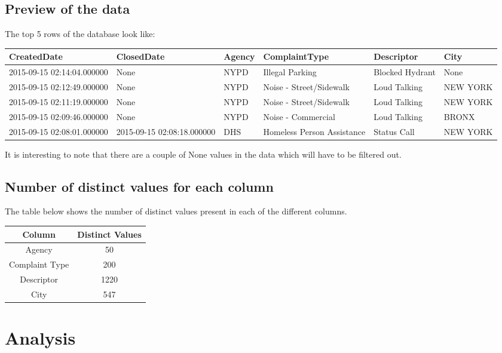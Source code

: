 \documentclass[12pt,a4paper]{article}
\begin{document}
\subsection{Preview of the data}
The top 5 rows of the database look like:

\begin{center}
 \begin{tabular}{||p{3cm} p{3cm} p{1cm} p{3cm} p{3cm} p{1.5cm}||}
 \hline
 CreatedDate & ClosedDate & Agency & ComplaintType & Descriptor & City \\ [0.5ex]
 \hline\hline
 2015-09-15 02:14:04.000000 & None & NYPD & Illegal Parking & Blocked Hydrant & None \\
 \hline
 2015-09-15 02:12:49.000000 & None & NYPD & Noise - Street/Sidewalk & Loud Talking & NEW YORK \\
 \hline
 2015-09-15 02:11:19.000000 & None & NYPD & Noise - Street/Sidewalk & Loud Talking & NEW YORK \\
 \hline
 2015-09-15 02:09:46.000000 & None & NYPD & Noise - Commercial & Loud Talking & BRONX \\
 \hline
 2015-09-15 02:08:01.000000 & 2015-09-15 02:08:18.000000 & DHS & Homeless Person Assistance & Status Call  & NEW YORK \\ [1ex]
 \hline
\end{tabular}
\end{center}

It is interesting to note that there are a couple of None values in the data which will have to be filtered out.

\subsection{Number of distinct values for each column}
The table below shows the number of distinct values present in each of the different columns.
\begin{center}
 \begin{tabular}{||c c||}
 \hline
 Column & Distinct Values \\ [0.5ex]
 \hline\hline
Agency    & 50 \\
Complaint Type    & 200 \\
Descriptor   & 1220 \\
City   & 547 \\ [1ex]
 \hline
\end{tabular}
\end{center}

\section{Analysis}
\end{document}

